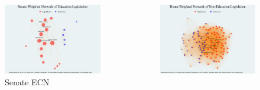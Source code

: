 \documentclass[final]{beamer}
\newlength{\onecolwid}
\newlength{\twocolwid}
\begin{document}
\begin{frame}[t]
\begin{columns}[t]
			\begin{column}{\twocolwid} %
				\begin{columns}[t,totalwidth=\twocolwid] %
					\begin{column}{\onecolwid}\vspace{-.6in} %
						\begin{figure}
							\includegraphics[scale=0.95]{senateedwgt-graph.pdf}
							\caption{Senate ECN \label{senateed}}
						\end{figure}
					\end{column} %
					\begin{column}{\onecolwid}\vspace{-.6in} %
						\begin{figure}
							\includegraphics[scale=0.95]{housenonedwgt-graph.pdf}

\end{figure}
\end{column}
\end{columns}
\end{column}
\end{columns}
\end{frame}
\end{document}
